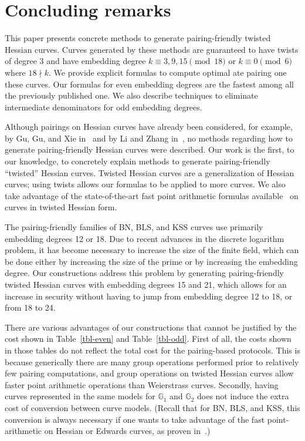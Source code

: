 \section{Concluding remarks}
\label{sec:conclude}

This paper presents concrete methods to generate pairing-friendly twisted Hessian curves.
Curves generated by these methods are guaranteed to have twists of degree $3$
and have embedding degree
$k \equiv 3,9,15 \pmod{18}$ or
$k \equiv 0 \pmod{6}$ where $18 \nmid k$.
We provide explicit formulas to compute optimal ate pairing one these curves.
Our formulas for even embedding degrees are the fastest among all the previously published one.
We also describe techniques to eliminate intermediate denominators for odd embedding degrees.

Although pairings on Hessian curves have already been considered,
for example, by Gu, Gu, and Xie in~\cite{2010/Gu} and by Li and Zhang in~\cite{2012/Li},
no methods regarding how to generate pairing-friendly Hessian curves were described.
Our work is the first, to our knowledge, to concretely explain methods to generate
pairing-friendly ``twisted'' Hessian curves. %
Twisted Hessian curves are a generalization of Hessian curves; using twists allows our formulas to be applied to more curves.
We also take advantage of the state-of-the-art fast point arithmetic formulas available~\cite{2015/hessian}
on curves in twisted Hessian form.

The pairing-friendly families of BN, BLS, and KSS curves use primarily embedding degrees 12 or 18.
Due to recent advances in the discrete logarithm problem, it has become necessary to increase the size of the finite field,
which can be done either by increasing the size of the prime or by increasing the embedding degree.
Our constructions address this problem by generating pairing-friendly twisted Hessian curves with embedding degrees 15 and 21,
which allows for an increase in security without having to jump from embedding degree 12 to 18, or from 18 to 24.

There are various advantages of our constructions that cannot be justified by the cost shown in Table~\ref{tbl-even} and Table~\ref{tbl-odd}.
First of all, the costs shown in those tables do not reflect the total cost for the pairing-based protocols.
This is because generically there are many group operations performed prior to relatively few pairing computations,
and group operations on twisted Hessian curves allow faster point arithmetic operations than Weierstrass curves.
Secondly, having curves represented in the same models for $\mathbb{G}_1$ and $\mathbb{G}_2$ does not induce the extra cost of conversion between curve models.
(Recall that for BN, BLS, and KSS, this conversion is always necessary if one wants to take advantage of
the fast point-arithmetic on Hessian or Edwards curves, as proven in~\cite{2013/bos-pairing}.)

